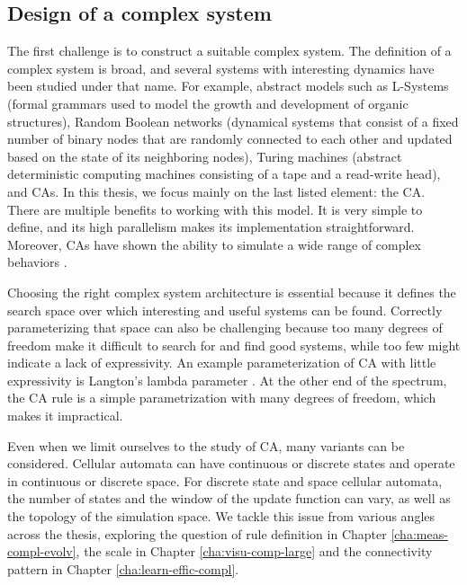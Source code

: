 \subsection{Design of a complex system\label{sec:design-compl-syst}}

The first challenge is to construct a suitable complex system. The definition of a 
complex system is broad, and several systems with
interesting dynamics have been studied under that name. For example, abstract models such as L-Systems (formal grammars used to model the growth and development of organic structures),
Random Boolean networks (dynamical systems that consist of a fixed number of binary nodes 
that are randomly connected to each other and updated based on the state of its neighboring 
nodes), Turing machines (abstract deterministic computing machines consisting of a tape and 
a read-write head), and \Acfp{CA}. In this thesis, we
focus mainly on the last listed element: the \acl{CA}. There are multiple
benefits to working with this model. It is very simple to define, and its high
parallelism makes its implementation straightforward. Moreover, \acp{CA} have
shown the ability to simulate a wide range of complex behaviors
\parencite{wolframNewKindScience2002}.

Choosing the right complex system architecture is essential because it defines
the search space over which interesting and useful systems can be found.
Correctly parameterizing that space can also be challenging because too many
degrees of freedom make it difficult to search for and find good systems, while
too few might indicate a lack of expressivity. An example parameterization of
\ac{CA} with little expressivity is Langton's lambda parameter
\parencite{langtonComputationEdgeChaos1990}. At the other end of the spectrum, the
\ac{CA} rule is a simple parametrization with many degrees of freedom, which
makes it impractical.

Even when we limit ourselves to the study of \ac{CA}, many variants can be
considered. Cellular automata can have continuous or discrete states and operate
in continuous or discrete space. For discrete state and space cellular automata,
the number of states and the window of the update function can vary, as well as the
topology of the simulation space. We tackle this issue from various angles
across the thesis, exploring the question of rule definition in Chapter
\ref{cha:meas-compl-evolv}, the scale in Chapter \ref{cha:visu-comp-large} and
the connectivity pattern in Chapter \ref{cha:learn-effic-compl}.

